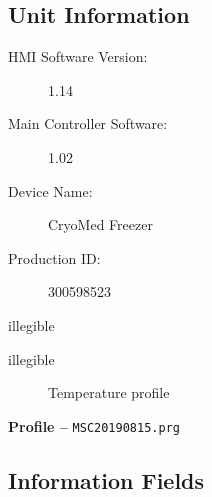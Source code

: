\documentclass[UTF8,10pt,a4paper,fontset=fandol]{ctexart}
\newcommand{\fieldvalue}[1]{#1}
\newcommand{\handwritten}[1]{#1}
\begin{document}
\subsection*{Unit Information}

\begin{description}
\item[HMI Software Version:]%
\fieldvalue{1.14}

\item[Main Controller Software:]%
\fieldvalue{1.02}

\item[Device Name:]%
\fieldvalue{CryoMed Freezer}

\item[Production ID:]%
\fieldvalue{300598523}
\end{description}

\handwritten{illegible}

\handwritten{illegible}

\begin{figure}[h]
\centering
{}
\caption{Temperature profile}
\end{figure}

\noindent\textbf{Profile -- }%
\fieldvalue{\texttt{MSC20190815.prg}}

\subsection*{Information Fields}
\end{document}
